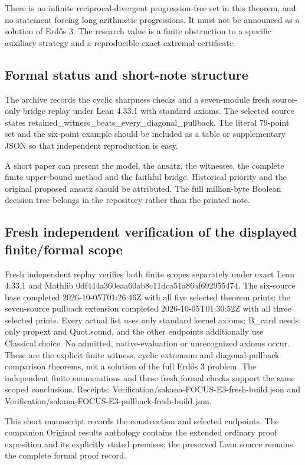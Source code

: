 \documentclass[11pt,a4paper]{article}
\begin{document}
There is no infinite reciprocal-divergent progression-free set in this theorem, and no statement forcing long arithmetic progressions. It must not be announced as a solution of Erdős 3. The research value is a finite obstruction to a specific auxiliary strategy and a reproducible exact extremal certificate.

\subsection{Formal status and short-note structure}
The archive records the cyclic sharpness checks and a seven-module fresh source-only bridge replay under Lean 4.33.1 with standard axioms. The selected source states retained\_witness\_beats\_every\_diagonal\_pullback. The literal 79-point set and the six-point example should be included as a table or supplementary JSON so that independent reproduction is easy.

A short paper can present the model, the ansatz, the witnesses, the complete finite upper-bound method and the faithful bridge. Historical priority and the original proposed ansatz should be attributed. The full million-byte Boolean decision tree belongs in the repository rather than the printed note.

\subsection{Fresh independent verification of the displayed finite/formal scope}
Fresh independent replay verifies both finite scopes separately under exact Lean 4.33.1 and Mathlib 0df444a360eaa60ab8c11dca51a86af692955474. The six-source base completed 2026-10-05T01:26:46Z with all five selected theorem prints; the seven-source pullback extension completed 2026-10-05T01:30:52Z with all three selected prints. Every actual list uses only standard kernel axioms; B\_card needs only propext and Quot.sound, and the other endpoints additionally use Classical.choice. No admitted, native-evaluation or unrecognized axioms occur. These are the explicit finite witness, cyclic extremum and diagonal-pullback comparison theorems, not a solution of the full Erdős 3 problem. The independent finite enumerations and these fresh formal checks support the same scoped conclusions. Receipts: Verification/sakana-FOCUS-E3-fresh-build.json and Verification/sakana-FOCUS-E3-pullback-fresh-build.json.

{\small This short manuscript records the construction and selected endpoints. The companion Original results anthology contains the extended ordinary proof exposition and its explicitly stated premises; the preserved Lean source remains the complete formal proof record.\par}
\end{document}
